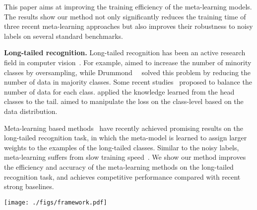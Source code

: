 \documentclass[final]{cvpr}
\newcommand{\methodname}{Faster Meta Update Strategy}
\begin{document}
This paper aims at improving the training efficiency of the meta-learning models. The results show our method not only significantly reduces the training time of three recent meta-learning approaches but also improves their robustness to noisy labels on several standard benchmarks.


\noindent\textbf{Long-tailed recognition.} Long-tailed recognition has been an active research field in computer vision~\cite{chawla2002smote, drummond2003c4, han2005borderline, shen2016relay, mahajan2018exploring, yin2019feature, liu2019large, khan2017cost, cui2019class, cao2019learning, Jamal_2020_CVPR, zhou2020bbn,zhu2020inflated}. 
For example, \cite{chawla2002smote, han2005borderline} aimed to increase the number of minority classes by oversampling, while Drummond~\etal~\cite{drummond2003c4} solved this problem by reducing the number of data in majority classes. Some recent studies~\cite{shen2016relay, mahajan2018exploring} proposed to balance the number of data for each class. \cite{yin2019feature, liu2019large} applied the knowledge learned from the head classes to the tail. 
\cite{khan2017cost, cui2019class, cao2019learning, zhou2020bbn} aimed to manipulate the loss on the class-level based on the data distribution. 

Meta-learning based methods~\cite{ren2018learning, shu2019meta, Jamal_2020_CVPR} have recently achieved promising results on the long-tailed recognition task, in which the meta-model is learned to assign larger weights to the examples of the long-tailed classes. Similar to the noisy labels, meta-learning suffers from slow training speed~\cite{ren2018learning, shu2019meta, wang2020training, Jamal_2020_CVPR}. We show our method improves the efficiency and accuracy of the meta-learning methods on the long-tailed recognition task, and achieves competitive performance compared with recent strong baselines.

 

\begin{figure*}[t]
\centering
\texttt{[image: ./figs/framework.pdf]}
\caption{Illustration of the proposed method. We propose a new Meta-Train step, named \methodname\space (\ie, the red line \textcircled{4}), which learns a gradient sampler (denoted as $\Gamma$) to aggregate the meta gradient for each layer. In this figure, the meta gradients from the $l$-th and $L$-th layers would be aggregated to compute $\mathbf{g}'$ and used to update the meta-model $\Psi$.}
\vspace{-2mm}
\label{fig:framework}
\end{figure*}
\end{document}
